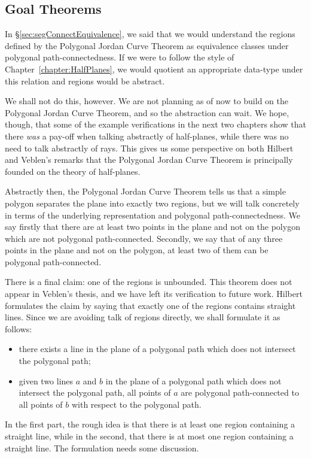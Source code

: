 \subsection{Goal Theorems}
In \S\ref{sec:segConnectEquivalence}, we said that we would understand the regions defined by the Polygonal Jordan Curve Theorem as equivalence classes under polygonal path-connectedness. If we were to follow the style of Chapter~\ref{chapter:HalfPlanes}, we would quotient an appropriate data-type under this relation and regions would be abstract.
 
We shall not do this, however. We are not planning as of now to build on the Polygonal Jordan Curve Theorem, and so the abstraction can wait. We hope, though, that some of the example verifications in the next two chapters show that there \emph{was} a pay-off when talking abstractly of half-planes, while there was no need to talk abstractly of rays. This gives us some perspective on both Hilbert and Veblen's remarks that the Polygonal Jordan Curve Theorem is principally founded on the theory of half-planes.

Abstractly then, the Polygonal Jordan Curve Theorem tells us that a simple polygon separates the plane into exactly two regions, but we will talk concretely in terms of the underlying representation and polygonal path-connectedness. We say firstly that there are at least two points in the plane and not on the polygon which are not polygonal path-connected. Secondly, we say that of any three points in the plane and not on the polygon, at least two of them can be polygonal path-connected.

There is a final claim: one of the regions is unbounded. This theorem does not appear in Veblen's thesis, and we have left its verification to future work. Hilbert formulates the claim by saying that exactly one of the regions contains straight lines. Since we are avoiding talk of regions directly, we shall formulate it as follows:
\begin{itemize}
\item there exists a line in the plane of a polygonal path which does not intersect the polygonal path;
\item given two lines $a$ and $b$ in the plane of a polygonal path which does not intersect the polygonal path, all points of $a$ are polygonal path-connected to all points of $b$ with respect to the polygonal path.
\end{itemize}

In the first part, the rough idea is that there is at least one region containing a straight line, while in the second, that there is at most one region containing a straight line. The formulation needs some discussion. 


